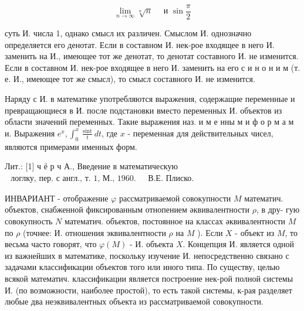 \documentclass[10pt]{article}
\begin{document}
\[

\lim _{n \rightarrow \infty} \sqrt[n]{n} \quad \text { и } \sin \frac{\pi}{2}

\]



суть И. числа 1, однако смысл их различен. Смыслом И. однозначно определяется его денотат. Если в составном И. нек-рое входящее в него И. заменить на И., имеющее тот же денотат, то денотат составного И. не изменится. Если в составном И. нек-рое входящее в него И. заменить на его с и н о н и м (т. е. И., имеющее тот же смысл), то смысл составного И. не изменится.



Наряду с И. в математике употребляются выражения, содержащие переменные и превращающиеся в И. после подстановки вместо переменных И. объектов из области значений переменных. Такие выражения наз. и м е нны м и ф о р м а м и. Выражения $e^{x}, \int_{0}^{x} \frac{\operatorname{sint}}{t} d t$, где $x$ - переменная для действительных чисел, являются примерами именных форм.



Лит.: [1] ч ё р ч А., Введение в математическую $\begin{array}{ll}\text { логлку, пер. с англ., т. 1, М., 1960. } & \text { В.Е. Плиско. }\end{array}$



ИНВАРИАНТ - отображение $\varphi$ рассматриваемой совокупности $M$ математич. объектов, снабженной фиксированным отнопением әквивалентности $\rho$, в дру- гую совокупность $N$ математич. объектов, постоянное на классах әквивалентности $M$ по $\rho$ (точнее: И. отношения эквивалентности $\rho$ на $M$ ). Если $X$ - объект из $M$, то весьма часто говорят, что $\varphi(M)$ - И. объекта $X$. Концепция И. является одной из важнейших в математике, поскольку изучение И. непосредственно связано с задачами классификации объектов того или иного типа. По существу, целью всякой математич. классификации является построение нек-рой полной системы И. (по возможности, наиболее простой), то есть такой системы, к-рая разделяет любые два неэквивалентных объекта из рассматриваемой совокупности.
\end{document}
